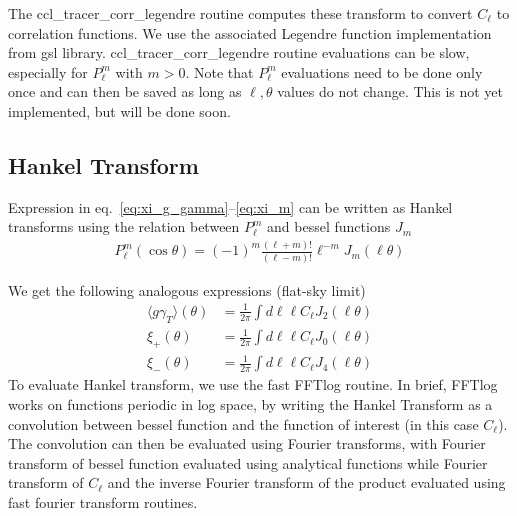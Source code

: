 \documentclass[]{article}
\begin{document}
	The ccl\_tracer\_corr\_legendre routine computes these transform to convert $C_\ell$ to correlation functions. We
	use the associated Legendre function implementation from gsl library.
	ccl\_tracer\_corr\_legendre routine evaluations can be slow, especially for $P_\ell^m$ with $m>0$. Note that 
	$P_\ell^m$ evaluations need to be done only once and can then be saved as long as $\ell,\theta$ values do not change.
	This is not yet implemented, but will be done soon.
		
	\subsection{Hankel Transform}
		Expression in eq.~\ref{eq:xi_g_gamma}--\ref{eq:xi_m} can be written as Hankel transforms using the relation 
		between $P_{\ell}^m$ and bessel functions $J_m$
		\begin{align}
			P_{\ell}^m(\cos\theta)=(-1)^m\frac{(\ell+m)!}{(\ell-m)!}\ell^{-m}J_m(\ell\theta)
		\end{align}

		We get the following analogous expressions (flat-sky limit)
		\begin{align}
			\langle g\gamma_T\rangle(\theta)&=\frac{1}{2\pi}\int d\ell\ell C_\ell J_2(\ell\theta)\\
			\xi_+(\theta)&=\frac{1}{2\pi}\int d\ell\ell C_\ell J_0(\ell\theta)\\
			\xi_-(\theta)&=\frac{1}{2\pi}\int d\ell\ell C_\ell J_4(\ell\theta)
		\end{align}
		To evaluate Hankel transform, we use the fast FFTlog routine\citep{Hamilton2000,Talman2009}. In brief, FFTlog 
		works on functions periodic in log space, by writing the Hankel Transform as a convolution between bessel function 
		and the function of interest (in this case $C_\ell$). The convolution can 
		then be evaluated using Fourier transforms, with Fourier transform of bessel function evaluated using analytical 
		functions while Fourier transform of $C_\ell$ and the inverse Fourier transform of the product 
		evaluated using fast fourier transform routines. 
	
\end{document}
